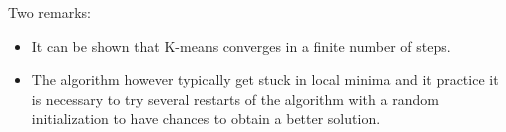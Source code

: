 \documentclass[12pt]{report}	%
\begin{document}
Two remarks:
\begin{itemize}
\item It can be shown that K-means converges in a finite number of steps.
\item The algorithm however typically get stuck in local minima and it practice it is necessary to try several restarts of the algorithm with a random initialization to have chances to obtain a better solution.
\end{itemize}
\end{document}

